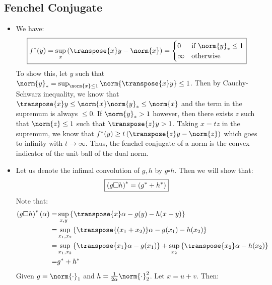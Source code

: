 \documentclass[math, info]{cours}
\begin{document}
\subsection*{Fenchel Conjugate}
\begin{itemize}
	\item We have:
		\begin{equation*}
			\boxed{%
			f^{*}(y) = \sup_{x}\left( \transpose{x}y -\norm{x} \right) = \begin{cases}
				0 & \text{if } \norm{y}_{*} \leq 1\\
				\infty &  \text{otherwise}
			\end{cases}}
		\end{equation*}
		To show this, let $y$ such that $\norm{y}_{*} = \sup_{\norm{x} \leq 1} \norm{\transpose{x}y} \leq 1$.
		Then by Cauchy-Schwarz inequality, we know that $\transpose{x}y \leq \norm{x}\norm{y}_{*}\leq \norm{x}$ and the term in the supremum is always $\leq 0$.
		If $\norm{y}_{*} > 1$ however, then there exists $z$ such that $\norm{z} \leq 1$ such that $\transpose{z}y > 1$.
		Taking $x = tz$ in the supremum, we know that $f^{*}(y) \geq t\left( \transpose{z}y -\norm{z} \right)$ which goes to infinity with $t \to \infty$.
		Thus, the fenchel conjugate of a norm is the convex indicator of the unit ball of the dual norm.
	\item Let us denote the infimal convolution of $g, h$ by $g \square h$.
		Then we will show that:
		\begin{equation*}
			\boxed{%
			\left( g \square h \right)^{*} = \left( g^{*} + h^{*} \right)}
		\end{equation*}
		Note that:
		\begin{equation*}
			\begin{aligned}
				\left( g\square h \right)^{*}(\alpha) =& \sup_{x, y} \left\{ \transpose{x}\alpha - g(y) - h(x - y) \right\}\\
			=& \sup_{x_{1}, x_{2}} \left\{ \transpose{\left( x_{1} + x_{2} \right)}\alpha - g(x_{1}) - h(x_{2}) \right\}\\
			=& \sup_{x_{1}, x_{2}} \left\{ \transpose{x_{1}}\alpha - g(x_{1})\right\} + \sup_{x_{2}}\left\{ \transpose{x_{2}}\alpha - h(x_{2}) \right\}\\
			=& g^{*} + h^{*}
		\end{aligned}
		\end{equation*}
		Given $g = \norm{\cdot}_{1}$ and $h = \frac{1}{2\alpha}\norm{\cdot}_{2}^{2}$.
		Let $x = u + v$. Then:
		\begin{equation*}

\end{equation*}
\end{itemize}
\end{document}
